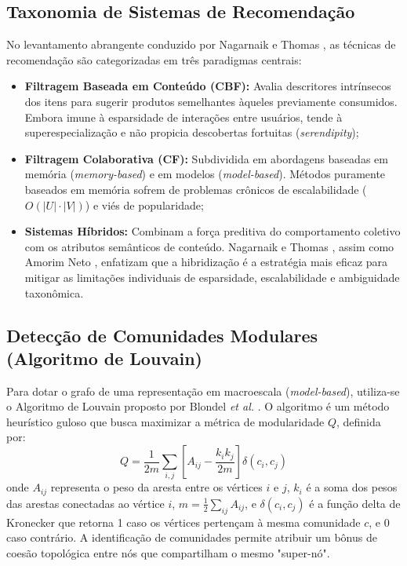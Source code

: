 \documentclass[conference]{IEEEtran}
\begin{document}
\subsection{Taxonomia de Sistemas de Recomendação}
No levantamento abrangente conduzido por Nagarnaik e Thomas \cite{nagarnaik2015}, as técnicas de recomendação são categorizadas em três paradigmas centrais:
\begin{itemize}
    \item \textbf{Filtragem Baseada em Conteúdo (CBF):} Avalia descritores intrínsecos dos itens para sugerir produtos semelhantes àqueles previamente consumidos. Embora imune à esparsidade de interações entre usuários, tende à superespecialização e não propicia descobertas fortuitas (\textit{serendipity});
    \item \textbf{Filtragem Colaborativa (CF):} Subdividida em abordagens baseadas em memória (\textit{memory-based}) e em modelos (\textit{model-based}). Métodos puramente baseados em memória sofrem de problemas crônicos de escalabilidade ($O(|U| \cdot |V|)$) e viés de popularidade;
    \item \textbf{Sistemas Híbridos:} Combinam a força preditiva do comportamento coletivo com os atributos semânticos de conteúdo. Nagarnaik e Thomas \cite{nagarnaik2015}, assim como Amorim Neto \cite{amorim2024}, enfatizam que a hibridização é a estratégia mais eficaz para mitigar as limitações individuais de esparsidade, escalabilidade e ambiguidade taxonômica.
\end{itemize}

\subsection{Detecção de Comunidades Modulares (Algoritmo de Louvain)}
Para dotar o grafo de uma representação em macroescala (\textit{model-based}), utiliza-se o Algoritmo de Louvain proposto por Blondel \textit{et al.} \cite{blondel2008}. O algoritmo é um método heurístico guloso que busca maximizar a métrica de modularidade $Q$, definida por:
\begin{equation}
Q = \frac{1}{2m} \sum_{i,j} \left[ A_{ij} - \frac{k_i k_j}{2m} \right] \delta(c_i, c_j)
\label{eq:louvain}
\end{equation}
onde $A_{ij}$ representa o peso da aresta entre os vértices $i$ e $j$, $k_i$ é a soma dos pesos das arestas conectadas ao vértice $i$, $m = \frac{1}{2}\sum_{ij} A_{ij}$, e $\delta(c_i, c_j)$ é a função delta de Kronecker que retorna 1 caso os vértices pertençam à mesma comunidade $c$, e 0 caso contrário. A identificação de comunidades permite atribuir um bônus de coesão topológica entre nós que compartilham o mesmo "super-nó".
\end{document}
